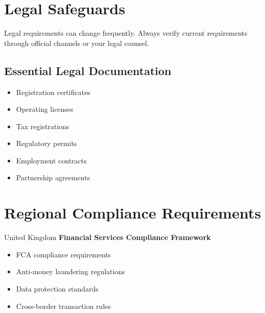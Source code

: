 \FloatBarrier
\section{Legal Safeguards}

\begin{warningbox}
Legal requirements can change frequently. Always verify current requirements through official channels or your legal counsel.
\end{warningbox}

\subsection{Essential Legal Documentation}
\begin{tcolorbox}[colback=white,colframe=primarydark,title=\textbf{Documentation Checklist}]
\begin{itemize}
    \item Registration certificates
    \item Operating licenses
    \item Tax registrations
    \item Regulatory permits
    \item Employment contracts
    \item Partnership agreements
\end{itemize}
\end{tcolorbox}

\FloatBarrier
\section{Regional Compliance Requirements}

\begin{regionalbox}{United Kingdom}
\textbf{Financial Services Compliance Framework}
\begin{itemize}
    \item FCA compliance requirements
    \item Anti-money laundering regulations
    \item Data protection standards
    \item Cross-border transaction rules
\end{itemize}
\end{regionalbox}

\FloatBarrier
